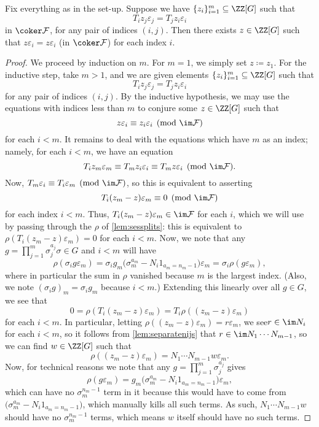\documentclass{article}
\numberwithin{equation}{section}
\begin{document}
\begin{lemma} \label{lem:cocycleforcecohere}
	Fix everything as in the set-up. Suppose we have $\{z_i\}_{i=1}^m\subseteq\ZZ[G]$ such that
	\[T_iz_j\varepsilon_j=T_jz_i\varepsilon_i\]
	in $\coker\mathcal F$, for any pair of indices $(i,j)$. Then there exists $z\in\ZZ[G]$ such that $z\varepsilon_i=z\varepsilon_i$ (in $\coker\mathcal F$) for each index $i$.
\end{lemma}
\begin{proof}
	We proceed by induction on $m$. For $m=1$, we simply set $z\coloneqq z_1$. For the inductive step, take $m>1$, and we are given elements $\{z_i\}_{i=1}^m\subseteq\ZZ[G]$ such that
	\[T_iz_j\varepsilon_j=T_jz_i\varepsilon_i\]
	for any pair of indices $(i,j)$. By the inductive hypothesis, we may use the equations with indices less than $m$ to conjure some $z\in\ZZ[G]$ such that
	\[z\varepsilon_i\equiv z_i\varepsilon_i\pmod{\im\mathcal F}\]
	for each $i<m$. It remains to deal with the equations which have $m$ as an index; namely, for each $i<m$, we have an equation
	\[T_iz_m\varepsilon_m\equiv T_mz_i\varepsilon_i\equiv T_mz\varepsilon_i\pmod{\im\mathcal F}.\]
	Now, $T_m\varepsilon_i\equiv T_i\varepsilon_m\pmod{\im\mathcal F}$, so this is equivalent to asserting
	\[T_i(z_m-z)\varepsilon_m\equiv0\pmod{\im\mathcal F}\]
	for each index $i<m$. Thus, $T_i(z_m-z)\varepsilon_m\in\im\mathcal F$ for each $i$, which we will use by passing through the $\rho$ of \autoref{lem:sessplits}: this is equivalent to $\rho(T_i(z_m-z)\varepsilon_m)=0$ for each $i<m$. Now, we note that any $g=\prod_{j=1}^m\sigma_j^{a_j}\sigma\in G$ and $i<m$ will have
	\[\rho(\sigma_ig\varepsilon_m)=\sigma_ig_m\big(\sigma_m^{a_m}-N_i1_{a_m=n_m-1}\big)\varepsilon_m=\sigma_i\rho(g\varepsilon_m),\]
	where in particular the sum in $\rho$ vanished because $m$ is the largest index. (Also, we note $(\sigma_ig)_m=\sigma_ig_m$ because $i<m$.) Extending this linearly over all $g\in G$, we see that
	\[0=\rho(T_i(z_m-z)\varepsilon_m)=T_i\rho((z_m-z)\varepsilon_m)\]
	for each $i<m$. In particular, letting $\rho((z_m-z)\varepsilon_m)=r\varepsilon_m$, we see$r\in\im N_i$ for each $i<m$, so it follows from \autoref{lem:separatenijs} that $r\in\im N_1\cdots N_{m-1}$, so we can find $w\in\ZZ[G]$ such that
	\[\rho((z_m-z)\varepsilon_m)=N_1\cdots N_{m-1}w\varepsilon_m.\]
	Now, for technical reasons we note that any $g=\prod_{j=1}^m\sigma_j^{a_j}$ gives
	\[\rho(g\varepsilon_m)=g_m\big(\sigma_m^{a_m}-N_i1_{a_m=n_m-1}\big)\varepsilon_m,\]
	which can have no $\sigma_m^{n_m-1}$ term in it because this would have to come from $\big(\sigma_m^{a_m}-N_i1_{a_m=n_m-1}\big)$, which manually kills all such terms. As such, $N_1\cdots N_{m-1}w$ should have no $\sigma_m^{n_m-1}$ terms, which means $w$ itself should have no such terms.


\end{proof}
\end{document}
